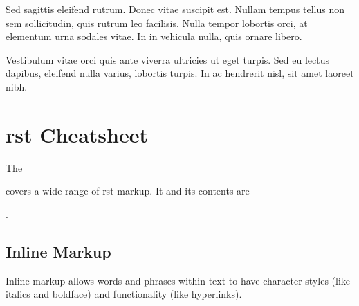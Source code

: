 \documentclass[letterpaper,10pt,english]{sphinxmanual}
\begin{document}
Sed sagittis eleifend rutrum. Donec vitae suscipit est. Nullam tempus tellus
non sem sollicitudin, quis rutrum leo facilisis. Nulla tempor lobortis orci,
at elementum urna sodales vitae. In in vehicula nulla, quis ornare libero.



Vestibulum vitae orci quis ante viverra ultricies ut eget turpis. Sed eu
lectus dapibus, eleifend nulla varius, lobortis turpis. In ac hendrerit nisl,
sit amet laoreet nibh.




\section{rst Cheatsheet}
\label{\detokenize{rst-cheatsheet/rst-cheatsheet:rst-cheatsheet}}\label{\detokenize{rst-cheatsheet/rst-cheatsheet::doc}}
The %
\begin{footnote}[8]\sphinxAtStartFootnote
{}
%
\end{footnote} covers a wide range of
rst markup. It and its contents are
%
\begin{footnote}[9]\sphinxAtStartFootnote
{}
%
\end{footnote}.


\subsection{Inline Markup}
\label{\detokenize{rst-cheatsheet/rst-cheatsheet:inline-markup}}
Inline markup allows words and phrases within text to have character styles (like italics and boldface) and functionality (like hyperlinks).
\end{document}
